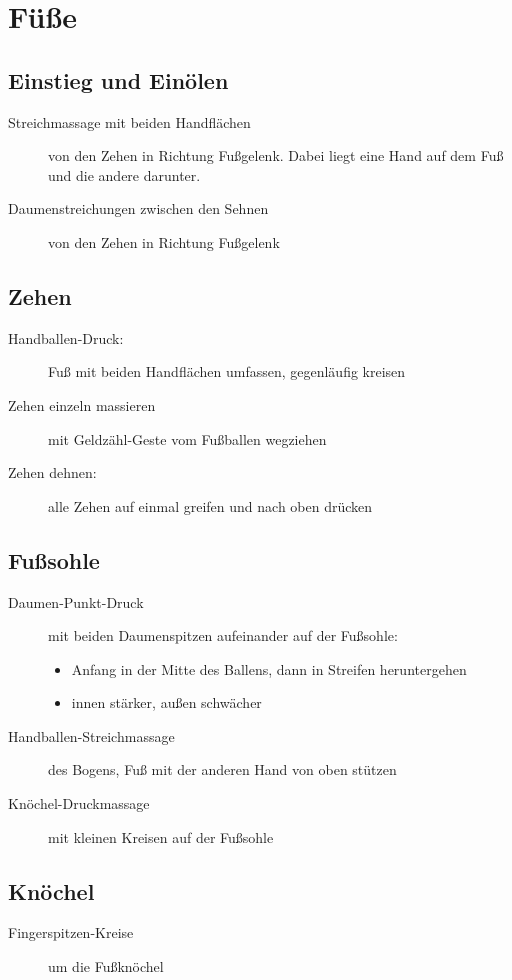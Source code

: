 \section{Füße}
\enlargethispage{2em}

\subsection{Einstieg und Einölen}
\begin{description}
  \item[Streichmassage mit beiden Handflächen] von den Zehen in Richtung Fußgelenk. Dabei liegt eine Hand auf dem Fuß und die andere darunter.
  \item[Daumenstreichungen zwischen den Sehnen] von den Zehen in Richtung Fußgelenk
\end{description}

\subsection{Zehen}
\begin{description}
  \item[Handballen-Druck:] Fuß mit beiden Handflächen umfassen, gegenläufig kreisen
  \item[Zehen einzeln massieren] mit Geldzähl-Geste vom Fußballen wegziehen
  \item[Zehen dehnen:] alle Zehen auf einmal greifen und nach oben drücken
\end{description}

\subsection{Fußsohle}
\begin{description}
\item[Daumen-Punkt-Druck] mit beiden Daumenspitzen aufeinander auf der Fußsohle:
  \begin{itemize}
    \item Anfang in der Mitte des Ballens, dann in Streifen heruntergehen
    \item innen stärker, außen schwächer
  \end{itemize}
\item[Handballen-Streichmassage] des Bogens, Fuß mit der anderen Hand von oben stützen
\item[Knöchel-Druckmassage] mit kleinen Kreisen auf der Fußsohle
\end{description}

\subsection{Knöchel}
\begin{description}
  \item[Fingerspitzen-Kreise] um die Fußknöchel
\end{description}

